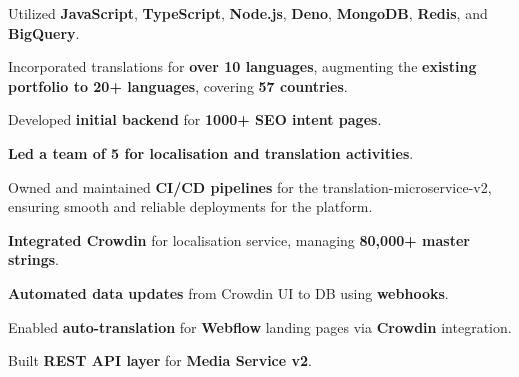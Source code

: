 \documentclass[]{deedy-resume-openfont}
\begin{document}
\begin{minipage}[t]{0.66\textwidth}
\sectionsep
\begin{tightemize}
\item Utilized \textbf{JavaScript}, \textbf{TypeScript}, \textbf{Node.js}, \textbf{Deno}, \textbf{MongoDB}, \textbf{Redis}, and \textbf{BigQuery}.
\item Incorporated translations for \textbf{over 10 languages}, augmenting the \textbf{existing portfolio to 20+ languages}, covering \textbf{57 countries}.
\item Developed \textbf{initial backend} for \textbf{1000+ SEO intent pages}.
\item \textbf{Led a team of 5 for localisation and translation activities}.
\item Owned and maintained \textbf{CI/CD pipelines} for the translation-microservice-v2, ensuring smooth and reliable deployments for the platform. 
\item \textbf{Integrated Crowdin} for localisation service, managing \textbf{80,000+ master strings}.
\item \textbf{Automated data updates} from Crowdin UI to DB using \textbf{webhooks}.
\item Enabled \textbf{auto-translation} for \textbf{Webflow} landing pages via \textbf{Crowdin} integration.
\item Built \textbf{REST API layer} for \textbf{Media Service v2}.
\end{tightemize}
\sectionsep


\end{minipage}
\end{document}
